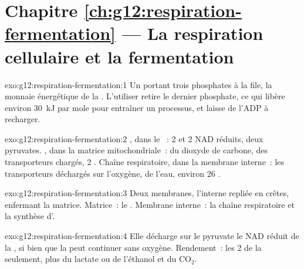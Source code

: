 \section*{Chapitre \ref{ch:g12:respiration-fermentation} --- La respiration cellulaire et la fermentation}

\begin{solution}{exo:g12:respiration-fermentation:1}
Un  portant trois phosphates à la file, la monnaie
énergétique de la . L'utiliser retire le dernier phosphate, ce
qui libère environ \qty{30}{kJ} par mole pour entraîner un processus,
et laisse de l'ADP à recharger.
\end{solution}

\begin{solution}{exo:g12:respiration-fermentation:2}
, dans le ~: 2  et 2 NAD réduits, deux
pyruvates. , dans la matrice mitochondriale~: du dioxyde
de carbone, des transporteurs chargés, 2 . Chaîne respiratoire,
dans la membrane interne~: les transporteurs déchargés sur l'oxygène,
de l'eau, environ 26 .
\end{solution}

\begin{solution}{exo:g12:respiration-fermentation:3}
Deux membranes, l'interne repliée en crêtes, enfermant la matrice.
Matrice~: le . Membrane interne~: la chaîne respiratoire
et la synthèse d'.
\end{solution}

\begin{solution}{exo:g12:respiration-fermentation:4}
Elle décharge sur le pyruvate le NAD réduit de la , si bien
que la  peut continuer sans oxygène. Rendement~: les 2  de
la  seulement, plus du lactate ou de l'éthanol et du
$\mathrm{CO_2}$.
\end{solution}

